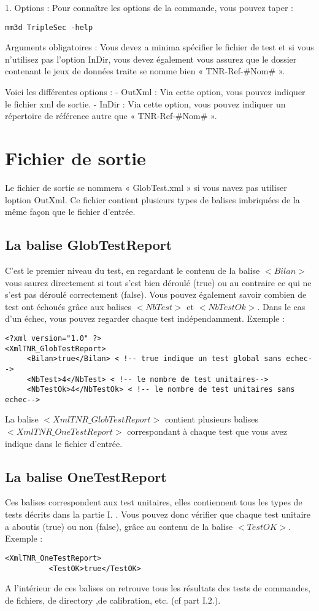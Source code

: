 \documentclass[a4paper]{book}
\begin{document}
1. Options :
Pour connaître les options de la commande, vous pouvez taper :
\begin{verbatim}
mm3d TripleSec -help
\end{verbatim}

Arguments obligatoires :
Vous devez a minima sp\'ecifier le fichier de test et si vous n'utilisez pas l'option InDir, vous devez \'egalement vous assurez que le dossier contenant le jeux de donn\'ees traite se nomme bien « TNR-Ref-\#Nom\# ».

Voici les diff\'erentes options :
- OutXml : Via cette option, vous pouvez indiquer le fichier xml de sortie.
- InDir : Via cette option, vous pouvez indiquer un r\'epertoire de r\'ef\'erence autre que « TNR-Ref-\#Nom\# ».

\section{Fichier de sortie}
Le fichier de sortie se nommera « GlobTest.xml » si vous navez pas utiliser loption OutXml.
Ce fichier contient plusieurs types de balises imbriqu\'ees de la m\^eme façon que le fichier d’entr\'ee.

\subsection{La balise GlobTestReport}
C'est le premier niveau du test, en regardant le contenu de la balise $<Bilan>$ vous saurez directement si tout s'est bien d\'eroul\'e (true) ou au contraire ce qui ne s'est pas d\'eroul\'e correctement (false). Vous pouvez \'egalement savoir combien de test ont \'echou\'es grâce aux balises $<NbTest>$ et $<NbTestOk>$.
Dans le cas d'un \'echec, vous pouvez regarder chaque test ind\'ependamment.
Exemple :
\begin{verbatim}
<?xml version="1.0" ?>
<XmlTNR_GlobTestReport>
     <Bilan>true</Bilan> < !-- true indique un test global sans echec-->
     <NbTest>4</NbTest> < !-- le nombre de test unitaires-->
     <NbTestOk>4</NbTestOk> < !-- le nombre de test unitaires sans echec-->
\end{verbatim}

La balise $<XmlTNR\_GlobTestReport>$ contient plusieurs balises $<XmlTNR\_OneTestReport>$ correspondant à chaque test que vous avez indique dans le fichier d’entr\'ee.
 
\subsection{La balise OneTestReport}
Ces balises correspondent aux test unitaires, elles contiennent tous les types de tests d\'ecrits dans la partie I. . Vous pouvez donc v\'erifier que chaque test unitaire a aboutis (true) ou non (false), grâce au contenu de la balise $<TestOK>$.
Exemple :
\begin{verbatim}
<XmlTNR_OneTestReport>
          <TestOK>true</TestOK>
\end{verbatim}
A l’int\'erieur de ces balises on retrouve tous les r\'esultats des tests de commandes, de fichiers, de directory ,de calibration, etc. (cf part I.2.).
\end{document}

